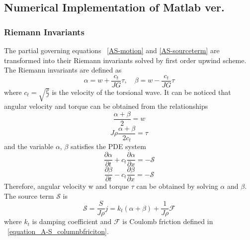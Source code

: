 \subsection{Numerical Implementation of Matlab ver.}
\subsubsection{Riemann Invariants}
The partial governing equations \equationname~\ref{AS-motion} and \ref{AS-sourceterm} are transformed into their Riemann invariants solved by first order upwind scheme. The Riemann invariants are defined as
\begin{equation}\label{AS-Riemann}
  \alpha = w + \frac{c_t}{JG}\tau, \quad \beta=w-\frac{c_t}{JG}\tau
\end{equation}
where $c_t = \sqrt{\frac{\rho}{J}}$ is the velocity of the torsional wave. It can be noticed that angular velocity and torque can be obtained from the relationships
\begin{equation}\label{equation_Riemann_relation1}
  \frac{\alpha + \beta}{2} = w
\end{equation}
\begin{equation}\label{equation_Riemann_relation2}
  J \rho \frac{\alpha + \beta}{2c_t} = \tau
\end{equation}
and the variable $\alpha$, $\beta$ satisfies the PDE system
\begin{equation}\label{AS-Riemann_alpha}
  \frac{\partial \alpha}{\partial t} + c_t\frac{\partial \alpha}{\partial x} = -\mathcal{S}
\end{equation}
\begin{equation}\label{AS-Riemann_beta}
  \frac{\partial \beta}{\partial t} - c_t\frac{\partial \beta}{\partial x} = -\mathcal{S}
\end{equation}
Therefore, angular velocity w and torque $\tau$ can be obtained by solving $\alpha$ and $\beta$.
The source term $\mathcal{S}$ is
\begin{equation}\label{AS-source}
  \mathcal{S} = \frac{S}{J \rho} j= k_t(\alpha + \beta) + \frac{1}{J \rho} \mathcal{F}
\end{equation}
where $k_t$ is damping coefficient and $\mathcal{F}$ is Coulomb friction defined in \equationname~\ref{equation_A-S_columnbfriciton}.
